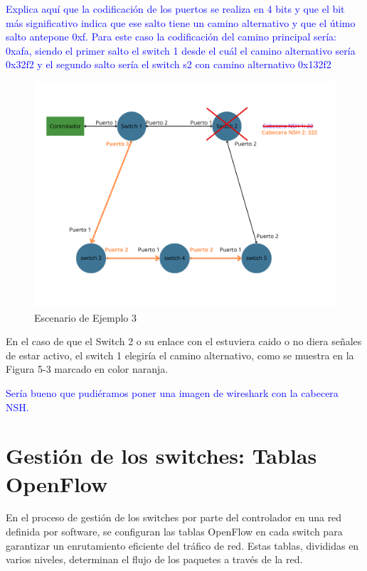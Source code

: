 \documentclass[a4paper, 12pt]{book}
\begin{document}
 \textcolor{blue}{Explica aquí que la codificación de los puertos se realiza en 4 bits y que el bit más significativo indica
que ese salto tiene un camino alternativo y que el útimo salto antepone 0xf.	
Para este caso la codificación del camino principal sería: 0xafa, siendo el primer salto el switch 1
desde el cuál el camino alternativo sería 0x32f2 y el segundo salto sería el switch s2 con camino alternativo
0x132f2}
	\begin{figure}[H]
		\centering
		\includegraphics[width=16cm, keepaspectratio]{img/Ejemplo Periplus 3}
		\caption{Escenario de Ejemplo 3}
		\label{figura:PeriplusEj3}
	\end{figure}
	
	En el caso de que el Switch 2 o su enlace con el estuviera caido o no diera señales de estar activo, el switch 1 elegiría el camino alternativo, como se muestra en la Figura 5-3 marcado en color naranja.
	
	 \textcolor{blue}{Sería bueno que pudiéramos poner una imagen de wireshark con la cabecera NSH.}

	\section{Gestión de los switches: Tablas OpenFlow}
	
	En el proceso de gestión de los switches por parte del controlador en una red definida por software, se configuran las tablas OpenFlow en cada switch para garantizar un enrutamiento eficiente del tráfico de red. Estas tablas, divididas en varios niveles, determinan el flujo de los paquetes a través de la red.
	
\end{document}

